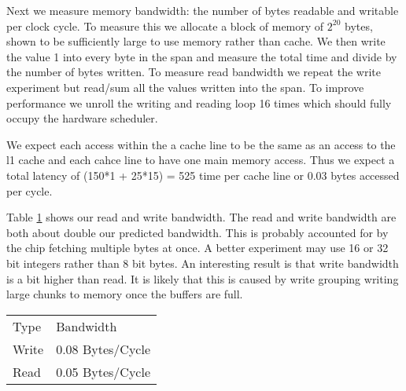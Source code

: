 Next we measure memory bandwidth: the number of bytes readable and writable per clock cycle.  
To measure this we allocate a block of memory of $2^{20}$ bytes, shown to be sufficiently large to use memory rather than cache.
We then write the value 1 into every byte in the span and measure the total time and divide by the number of bytes written.
To measure read bandwidth we repeat the write experiment but read/sum all the values written into the span.
To improve performance we unroll the writing and reading loop 16 times which should fully occupy the hardware scheduler.

We expect each access within the a cache line to be the same as an access to the l1 cache and each cahce line to have one main memory access.  Thus we expect a total latency of (150*1 + 25*15) = 525 time per cache line or 0.03 bytes accessed per cycle.  

Table \ref{tab:exp_2_2} shows our read and write bandwidth.  The read and write bandwidth are both about double our predicted bandwidth.  This is probably accounted for by the chip fetching multiple bytes at once.  A better experiment may use 16 or 32 bit integers rather than 8 bit bytes.  An interesting result is that write bandwidth is a bit higher than read.  It is likely that this is caused by write grouping writing large chunks to memory once the buffers are full. 

\begin{table}[h]
\label{tab:exp_2_2}
\begin{tabular}{ll}
Type  & Bandwidth        \\
Write & 0.08 Bytes/Cycle \\
Read  & 0.05 Bytes/Cycle
\end{tabular}
\end{table}